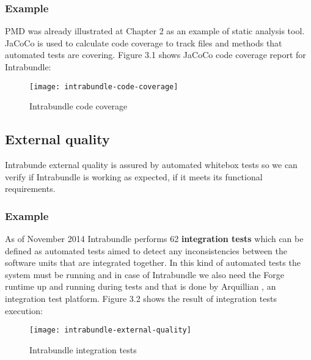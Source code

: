 \subsubsection{Example}
 PMD was already illustrated at Chapter 2 as an example of static analysis tool. JaCoCo is used to calculate code coverage to track files and methods that automated tests are covering. Figure 3.1 shows JaCoCo code coverage report for Intrabundle:

\begin{figure}[h]
\caption{Intrabundle code coverage}
\texttt{[image: intrabundle-code-coverage]}
\end{figure}

\FloatBarrier

\subsection{External quality}
Intrabunde external quality is assured by automated whitebox tests so we can verify if Intrabundle is working as expected, if it meets its functional requirements.

\subsubsection{Example}
As of November 2014 Intrabundle performs 62 \textbf{integration tests} which can be defined as automated tests aimed to detect any inconsistencies between the software units that are integrated together. In this kind of automated tests the system must be running and in case of Intrabundle we also need the Forge runtime up and running during tests and that is done by Arquillian \citep{dan 2011}, an integration test platform. Figure 3.2 shows the result of integration tests execution:

\begin{figure}[h]
\caption{Intrabundle integration tests}
\texttt{[image: intrabundle-external-quality]}
\centering
\end{figure}

\FloatBarrier